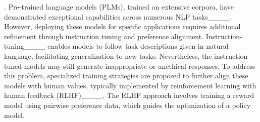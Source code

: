 
. 
%
%
%
%
Pre-trained language models (PLMs), trained on extensive corpora, have demonstrated exceptional capabilities across numerous NLP tasks____.
However, deploying these models for specific applications requires additional refinement through instruction tuning and preference alignment.
Instruction-tuning____ enables models to follow task descriptions given in natural language, facilitating generalization to new tasks. 
Nevertheless, the instruction-tuned models may still generate inappropriate or unethical responses.
To address this problem, specialized training strategies are proposed to further align these models with human values, typically implemented by reinforcement learning with human feedback (RLHF)____.
The RLHF approach involves training a reward model using pairwise preference data, which guides the optimization of a policy model.
